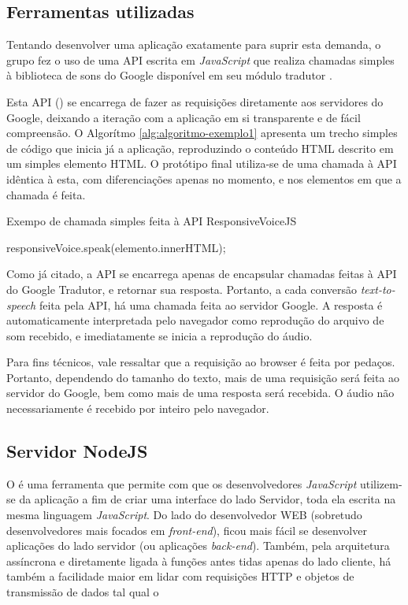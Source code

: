 \documentclass[
	12pt,				%
	oneside,			%
	a4paper,			%
	english,			%
	brazil				%
	]{abntex2ppgsi}
\begin{document}
\subsection{Ferramentas utilizadas}

Tentando desenvolver uma aplicação exatamente para suprir esta demanda, o grupo fez o uso de uma API escrita em \textit{JavaScript} que realiza chamadas simples à biblioteca de sons do Google disponível em seu módulo tradutor \cite{googleTranslate}.

Esta API () se encarrega de fazer as requisições diretamente aos servidores do Google, deixando a iteração com a aplicação em si transparente e de fácil compreensão. O Algorítmo  \ref{alg:algoritmo-exemplo1} apresenta um trecho simples de código que inicia já a aplicação, reproduzindo o conteúdo HTML descrito em um simples elemento HTML. O protótipo final utiliza-se de uma chamada à API idêntica à esta, com diferenciações apenas no momento, e nos elementos em que a chamada é feita.

\begin{algorithm}[htbp]
	\caption{Exempo de chamada simples feita à API ResponsiveVoiceJS}
	\label{alg:algoritmo-exemplo1}
	\begin{algorithmic}
		\State responsiveVoice.speak(elemento.innerHTML);
		\EndFunction
	\end{algorithmic}
\end{algorithm}

Como já citado, a API se encarrega apenas de encapsular chamadas feitas à API do Google Tradutor, e retornar sua resposta. Portanto, a cada conversão \textit{text-to-speech} feita pela API, há uma chamada  feita ao servidor Google. A resposta é automaticamente interpretada pelo navegador como reprodução do arquivo de som recebido, e imediatamente se inicia a reprodução do áudio. 

Para fins técnicos, vale ressaltar que a requisição ao browser é feita por pedaços. Portanto, dependendo do tamanho do texto, mais de uma requisição será feita ao servidor do Google, bem como mais de uma resposta será recebida. O áudio não necessariamente é recebido por inteiro pelo navegador. 

\subsection{Servidor NodeJS}

O  é uma ferramenta que permite com que os desenvolvedores \textit{JavaScript} utilizem-se da aplicação a fim de criar uma interface do lado Servidor, toda ela escrita na mesma linguagem \textit{JavaScript}. Do lado do desenvolvedor WEB (sobretudo desenvolvedores mais focados em \textit{front-end}), ficou mais fácil se desenvolver aplicações do lado servidor (ou aplicações \textit{back-end}). Também, pela arquitetura assíncrona e diretamente ligada à funções antes tidas apenas do lado cliente, há também a facilidade maior em lidar com requisições HTTP e objetos de transmissão de dados tal qual o 
\end{document}
